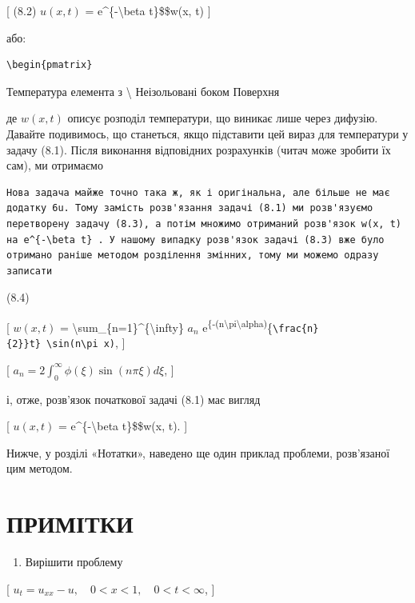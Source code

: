 \documentclass[
]{article}
\providecommand{\tightlist}{%
  \setlength{\itemsep}{0pt}\setlength{\parskip}{0pt}}
\begin{document}
{{{[} (8.2) \(u(x, t)\) = e\^{}\{-\textbackslash beta t\}\$\$w(x, t) {]}

або:

\begin{verbatim}
\begin{pmatrix}
\end{verbatim}

Температура елемента з \textbackslash{} Неізольовані боком Поверхня

де \(w(x, t)\) описує розподіл температури, що виникає лише через
дифузію. Давайте подивимось, що станеться, якщо підставити цей вираз для
температури у задачу (8.1). Після виконання відповідних розрахунків
(читач може зробити їх сам), ми отримаємо

\begin{verbatim}
Нова задача майже точно така ж, як і оригінальна, але більше не має додатку 6u. Тому замість розв'язання задачі (8.1) ми розв'язуємо перетворену задачу (8.3), а потім множимо отриманий розв'язок w(x, t) на e^{-\beta t} . У нашому випадку розв'язок задачі (8.3) вже було отримано раніше методом розділення змінних, тому ми можемо одразу записати
\end{verbatim}

(8.4)

{[} \(w(x, t)\) =
\textbackslash sum\_\{n=1\}\^{}\{\textbackslash infty\} \(a_n\)
e\textsuperscript{\{-(n\textbackslash pi\textbackslash alpha)}\{\texttt{\textbackslash{}frac\{n\}\{2\}\}t\}\ \textbackslash{}sin(n\textbackslash{}pi\ x)},
{]}

{[} \(a_n = 2 \int_0^{\infty} \phi(\xi) \sin(n\pi \xi) d\xi\), {]}

і, отже, розв'язок початкової задачі (8.1) має вигляд

{[} \(u(x, t)\) = e\^{}\{-\textbackslash beta t\}\$\$w(x, t). {]}

Нижче, у розділі «Нотатки», наведено ще один приклад проблеми,
розв'язаної цим методом.

\section{ПРИМІТКИ}\label{ux43fux440ux438ux43cux456ux442ux43aux438-1}

\begin{enumerate}
\def\labelenumi{\arabic{enumi}.}
\tightlist
\item
  Вирішити проблему
\end{enumerate}

{[} \(u_t = u_{xx} - u, \quad 0 < x < 1, \quad 0 < t < \infty\), {]}

}}
\end{document}
